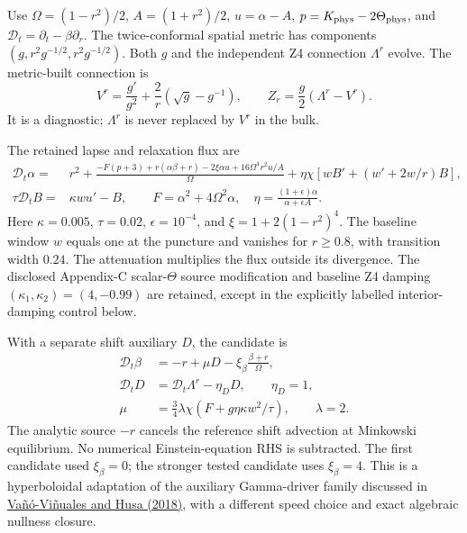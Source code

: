 \documentclass[11pt]{article}
\newcommand{\dt}{\mathcal D_t}
\begin{document}
Use $\Omega=(1-r^2)/2$, $A=(1+r^2)/2$, $u=\alpha-A$, $p=K_{\rm phys}-2\Theta_{\rm phys}$, and $\dt=\partial_t-\beta\partial_r$. The twice-conformal spatial metric has components $(g,r^2g^{-1/2},r^2g^{-1/2})$. Both $g$ and the independent Z4 connection $\Lambda^r$ evolve. The metric-built connection is
\begin{equation}
 V^r=\frac{g'}{g^2}+\frac{2}{r}(\sqrt g-g^{-1}),\qquad Z_r=\frac g2(\Lambda^r-V^r).
\end{equation}
It is a diagnostic; $\Lambda^r$ is never replaced by $V^r$ in the bulk.

The retained lapse and relaxation flux are
\begin{align}
 \dt\alpha={}&r^2+\frac{-F(p+3)+r(\alpha\beta+r)-2\xi\alpha u
                       +16\Omega^4r^2u/A}{\Omega}
       +\eta\chi\left[wB'+(w'+2w/r)B\right],\label{eq:lapse}\\
 \tau\dt B={}&\kappa w u'-B,\qquad
 F=\alpha^2+4\Omega^2\alpha,\quad
 \eta=\frac{(1+\epsilon)\alpha}{\alpha+\epsilon A}.
\end{align}
Here $\kappa=0.005$, $\tau=0.02$, $\epsilon=10^{-4}$, and $\xi=1+2(1-r^2)^4$. The baseline window $w$ equals one at the puncture and vanishes for $r\geq0.8$, with transition width $0.24$. The attenuation multiplies the flux outside its divergence. The disclosed Appendix-C scalar-$\Theta$ source modification and baseline Z4 damping $(\kappa_1,\kappa_2)=(4,-0.99)$ are retained, except in the explicitly labelled interior-damping control below.

With a separate shift auxiliary $D$, the candidate is
\begin{align}
 \dt\beta&=-r+\mu D-\xi_\beta\frac{\beta+r}{\Omega},\label{eq:driver}\\
 \dt D&=\dt\Lambda^r-\eta_D D,\qquad \eta_D=1,\\
 \mu&=\frac34\lambda\chi\left(F+g\eta\kappa w^2/\tau\right),\qquad\lambda=2.
\end{align}
The analytic source $-r$ cancels the reference shift advection at Minkowski equilibrium. No numerical Einstein-equation RHS is subtracted. The first candidate used $\xi_\beta=0$; the stronger tested candidate uses $\xi_\beta=4$. This is a hyperboloidal adaptation of the auxiliary Gamma-driver family discussed in \href{https://arxiv.org/html/1705.06298v3}{Va\~n\'o-Vi\~nuales and Husa (2018)}, with a different speed choice and exact algebraic nullness closure.
\end{document}
